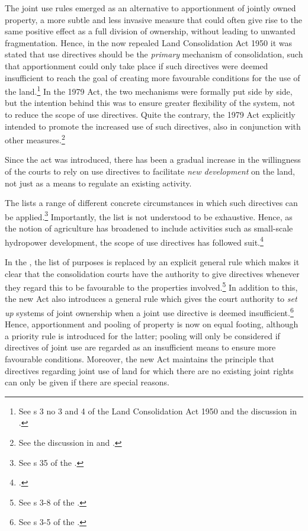 The joint use rules emerged as an alternative to apportionment of jointly owned property, a more subtle and less invasive measure that could often give rise to the same positive effect as a full division of ownership, without leading to unwanted fragmentation. Hence, in the now repealed Land Consolidation Act 1950 it was stated that use directives should be the \emph{primary} mechanism of consolidation, such that apportionment could only take place if such directives were deemed insufficient to reach the goal of creating more favourable conditions for the use of the land.\footnote{See s 3 no 3 and 4 of the Land Consolidation Act 1950 and the discussion in \cite[30-37]{nou76}.} In the 1979 Act, the two mechanisms were formally put side by side, but the intention behind this was to ensure greater flexibility of the system, not to reduce the scope of use directives. Quite the contrary, the 1979 Act explicitly intended to promote the increased use of such directives, also in conjunction with other measures.\footnote{See the discussion in \cite[35-37]{nou76} and \cite[47-48]{otprp56}.}

Since the act was introduced, there has been a gradual increase in the willingness of the courts to rely on use directives to facilitate \emph{new development} on the land, not just as a means to regulate an existing activity.

The \cite{lca79} lists a range of different concrete circumstances in which such directives can be applied.\footnote{See s 35 of the \cite{lca79}.} Importantly, the list is not understood to be exhaustive. Hence, as the notion of agriculture has broadened to include activities such as small-scale hydropower development, the scope of use directives has followed suit.\footcite[103]{otprp57}

In the \cite{lca13}, the list of purposes is replaced by an explicit general rule which makes it clear that the consolidation courts have the authority to give directives whenever they regard this to be favourable to the properties involved.\footnote{See s 3-8 of the \cite{lca13}.} In addition to this, the new Act also introduces a general rule which gives the court authority to \emph{set up} systems of joint ownership when a joint use directive is deemed insufficient.\footnote{See s 3-5 of the \cite{lca13}.} Hence, apportionment and pooling of property is now on equal footing, although a priority rule is introduced for the latter; pooling will only be considered if directives of joint use are regarded as an insufficient means to ensure more favourable conditions. Moreover, the new Act maintains the principle that directives regarding joint use of land for which there are no existing joint rights can only be given if there are special reasons.

